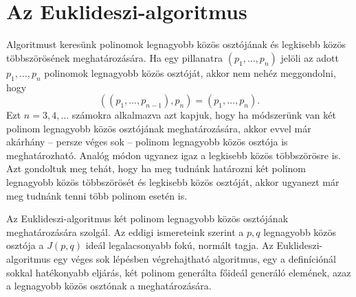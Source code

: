 \documentclass[9pt, a4paper, showtrims]{memoir}
\theoremstyle{plain}
\theoremstyle{remark}
\theoremstyle{definition}
\begin{document}
\section{Az Euklideszi-algoritmus}
Algoritmust keresünk polinomok legnagyobb közös osztójának és legkisebb közös többszörösének meghatározására.
Ha egy pillanatra $\left( p_1,\ldots,p_n \right)$ jelöli az adott $p_1,\ldots,p_n$ polinomok legnagyobb közös osztóját,
akkor nem nehéz meggondolni,
hogy
\[
	\left( \left( p_1,\ldots,p_{n-1} \right),p_n \right)=\left( p_1,\ldots,p_{n}\right).
\]
Ezt $n=3,4,\ldots$ számokra alkalmazva azt kapjuk,
hogy ha módszerünk van két polinom legnagyobb közös osztójának meghatározására,
akkor evvel már akárhány -- persze véges sok -- polinom legnagyobb közös osztója is meghatározható.
Analóg módon ugyanez igaz a legkisebb közös többszörösre is.
Azt gondoltuk meg tehát, hogy ha meg tudnánk határozni két polinom legnagyobb közös többszörösét és legkisebb közös osztóját,
akkor ugyanezt már meg tudnánk tenni több polinom esetén is.

Az Euklideszi-algoritmus két polinom legnagyobb közös osztójának meghatározására szolgál.
Az eddigi ismereteink szerint a $p,q$ legnagyobb közös osztója a $J\left( p,q \right)$ ideál legalacsonyabb
fokú, normált tagja.
Az Euklideszi-algoritmus egy véges sok lépésben végrehajtható algoritmus,
egy a definíciónál sokkal hatékonyabb eljárás, két polinom generálta főideál generáló elemének,
azaz a legnagyobb közös osztónak a meghatározására.
\end{document}
